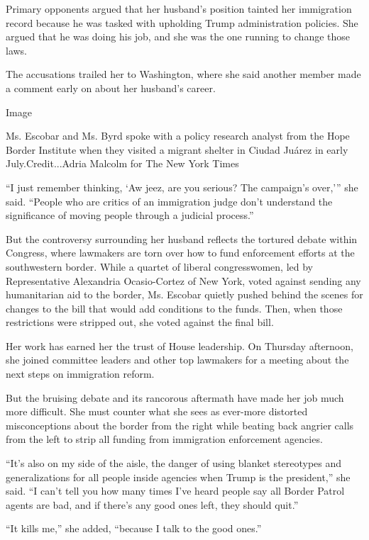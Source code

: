 Primary opponents argued that her husband's position tainted her
immigration record because he was tasked with upholding Trump
administration policies. She argued that he was doing his job, and she
was the one running to change those laws.

The accusations trailed her to Washington, where she said another member
made a comment early on about her husband's career.

Image

Ms. Escobar and Ms. Byrd spoke with a policy research analyst from the
Hope Border Institute when they visited a migrant shelter in Ciudad
Juárez in early July.Credit...Adria Malcolm for The New York Times

``I just remember thinking, `Aw jeez, are you serious? The campaign's
over,''' she said. ``People who are critics of an immigration judge
don't understand the significance of moving people through a judicial
process.''

But the controversy surrounding her husband reflects the tortured debate
within Congress, where lawmakers are torn over how to fund enforcement
efforts at the southwestern border. While a quartet of liberal
congresswomen, led by Representative Alexandria Ocasio-Cortez of New
York, voted against sending any humanitarian aid to the border, Ms.
Escobar quietly pushed behind the scenes for changes to the bill that
would add conditions to the funds. Then, when those restrictions were
stripped out, she voted against the final bill.

Her work has earned her the trust of House leadership. On Thursday
afternoon, she joined committee leaders and other top lawmakers for a
meeting about the next steps on immigration reform.

But the bruising debate and its rancorous aftermath have made her job
much more difficult. She must counter what she sees as ever-more
distorted misconceptions about the border from the right while beating
back angrier calls from the left to strip all funding from immigration
enforcement agencies.

``It's also on my side of the aisle, the danger of using blanket
stereotypes and generalizations for all people inside agencies when
Trump is the president,'' she said. ``I can't tell you how many times
I've heard people say all Border Patrol agents are bad, and if there's
any good ones left, they should quit.''

``It kills me,'' she added, ``because I talk to the good ones.''

